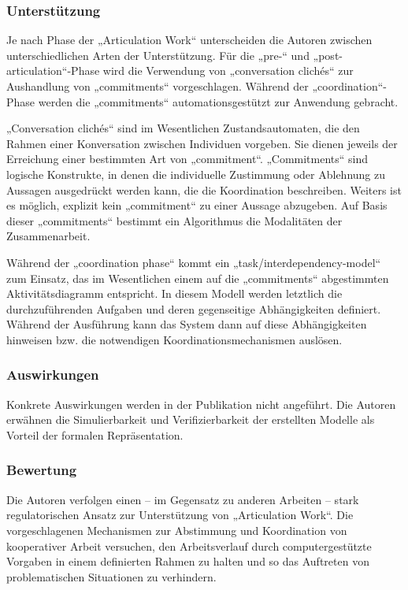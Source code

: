 \subsubsection{Unterstützung}

Je nach Phase der „Articulation Work“ unterscheiden die Autoren zwischen unterschiedlichen Arten der Unterstützung. Für die „pre-“ und „post-articulation“-Phase wird die Verwendung von „conversation clichés“ zur Aushandlung von „commitments“ vorgeschlagen. Während der „coordination“-Phase werden die „commitments“ automationsgestützt zur Anwendung gebracht.

„Conversation clichés“ sind im Wesentlichen Zustandsautomaten, die den Rahmen einer Konversation zwischen Individuen vorgeben. Sie dienen jeweils der Erreichung einer bestimmten Art von „commitment“. „Commitments“ sind logische Konstrukte, in denen die individuelle Zustimmung oder Ablehnung zu Aussagen ausgedrückt werden kann, die die Koordination beschreiben. Weiters ist es möglich, explizit kein „commitment“ zu einer Aussage abzugeben. Auf Basis dieser „commitments“ bestimmt ein Algorithmus die Modalitäten der Zusammenarbeit.

Während der „coordination phase“ kommt ein „task/interdependency-model“ zum Einsatz, das im Wesentlichen einem auf die „commitments“ abgestimmten Aktivitätsdiagramm entspricht. In diesem Modell werden letztlich die durchzuführenden Aufgaben und deren gegenseitige Abhängigkeiten definiert. Während der Ausführung kann das System dann auf diese Abhängigkeiten hinweisen bzw. die notwendigen Koordinationsmechanismen auslösen.

\subsubsection{Auswirkungen}

Konkrete Auswirkungen werden in der Publikation nicht angeführt. Die Autoren erwähnen die Simulierbarkeit und Verifizierbarkeit der erstellten Modelle als Vorteil der formalen Repräsentation. 

\subsubsection{Bewertung}
Die Autoren verfolgen einen -- im Gegensatz zu anderen Arbeiten -- stark regulatorischen Ansatz zur Unterstützung von „Articulation Work“. Die vorgeschlagenen Mechanismen zur Abstimmung und Koordination von kooperativer Arbeit versuchen, den Arbeitsverlauf durch computergestützte Vorgaben in einem definierten Rahmen zu halten und so das Auftreten von problematischen Situationen zu verhindern. 

